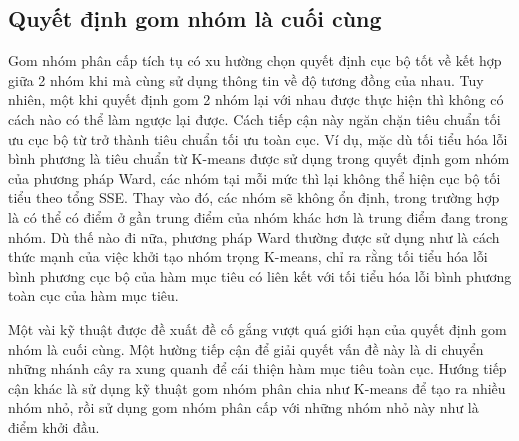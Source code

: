 \subsection{Quyết định gom nhóm là cuối cùng}
Gom nhóm phân cấp tích tụ có xu hường chọn quyết định cục bộ tốt về kết hợp giữa 2 nhóm khi mà cùng sử dụng thông tin về độ tương đồng của nhau.
Tuy nhiên, một khi quyết định gom 2 nhóm lại với nhau được thực hiện thì không có cách nào có thể làm ngược lại được.
Cách tiếp cận này ngăn chặn tiêu chuẩn tối ưu cục bộ từ trở thành tiêu chuẩn tối ưu toàn cục.
Ví dụ, mặc dù tối tiểu hóa lỗi bình phương là tiêu chuẩn từ K-means được sử dụng trong quyết định gom nhóm của phương pháp Ward, các nhóm tại mỗi mức thì lại không thể hiện cục bộ tối tiểu theo tổng SSE.
Thay vào đó, các nhóm sẽ không ổn định, trong trường hợp là có thể có điểm ở gần trung điểm của nhóm khác hơn là trung điểm đang trong nhóm.
Dù thế nào đi nữa, phương pháp Ward thường được sử dụng như là cách thức mạnh của việc khởi tạo nhóm trọng K-means, chỉ ra rằng tối tiểu hóa lỗi bình phương cục bộ của hàm mục tiêu có liên kết với tối tiểu hóa lỗi bình phương toàn cục của hàm mục tiêu.

Một vài kỹ thuật được đề xuất đề cố gắng vượt quá giới hạn của quyết định gom nhóm là cuối cùng.
Một hường tiếp cận để giải quyết vấn đề này là di chuyển những nhánh cây ra xung quanh để cái thiện hàm mục tiêu toàn cục.
Hướng tiếp cận khác là sử dụng kỹ thuật gom nhóm phân chia như K-means để tạo ra nhiều nhóm nhỏ, rồi sử dụng gom nhóm phân cấp với những nhóm nhỏ này như là điểm khởi đầu.






